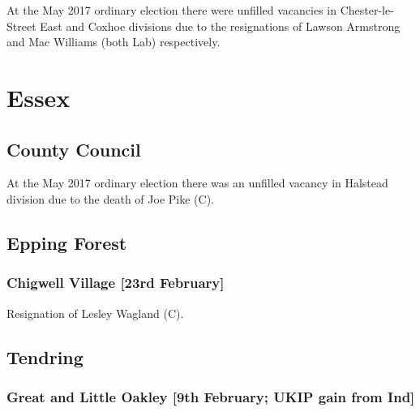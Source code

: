 \documentclass[a4paper,openany]{book}
\begin{document}
\begin{resultsiii}
At the May 2017 ordinary election there were unfilled vacancies in Chester-le-Street East and Coxhoe divisions due to the resignations of Lawson Armstrong and Mac Williams (both Lab) respectively.

\section{Essex}

\subsection*{County Council}

At the May 2017 ordinary election there was an unfilled vacancy in Halstead division due to the death of Joe Pike (C).

\subsection*{Epping Forest}

\subsubsection*{Chigwell Village \hspace*{\fill}\nolinebreak[1]%
\enspace\hspace*{\fill}
[23rd February]}


Resignation of Lesley Wagland (C).

\subsection*{Tendring}

\subsubsection*{Great and Little Oakley \hspace*{\fill}\nolinebreak[1]%
\enspace\hspace*{\fill}
[9th February; UKIP gain from Ind]}



\end{resultsiii}
\end{document}
